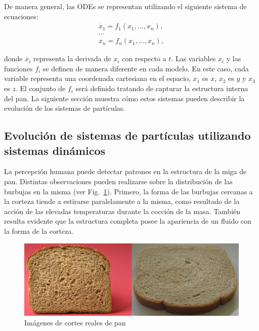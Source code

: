 De manera general, las ODEs se representan utilizando el siguiente sistema de ecuaciones:
\begin{equation} \label{eq:simple}  
  \begin{aligned}
    \dot{x_{1}} = f_{1}(x_{1},\ldots,x_{n}),\\
    \ldots\\
    \dot{x_{n}} = f_{n}(x_{1},\ldots,x_{n}),
  \end{aligned}
\end{equation}

\noindent donde $\dot{x_{i}}$ representa la derivada de $x_{i}$ con respecto
a $t$.
Las variables $x_{i}$ y las funciones $f_{i}$ se definen de manera diferente en cada modelo.
En este caso, cada variable representa una coordenada cartesiana en el espacio, $x_{1}$ es $x$, $x_{2}$ es $y$ y $x_{3}$ es $z$.
El conjunto de $f_{i}$ ser\'a definido tratando de capturar la estructura interna del pan. 
La siguiente secci\'on muestra cómo estos sistemas pueden describir la evoluci\'on de los sistemas de part\'iculas.

\subsection{Evoluci\'on de sistemas de part\'iculas utilizando sistemas din\'amicos}

La percepci\'on humana puede detectar patrones en la estructura de la miga de pan. Distintas observaciones pueden realizarse sobre la distribuci\'on de las burbujas en la misma (ver Fig.~\ref{fg:panreal}).
Primero, la forma de las burbujas cercanas a la corteza tiende a estirarse paralelamente a la misma, como resultado de la acci\'on de las elevadas temperaturas durante la cocci\'on de la masa.
Tambi\'en resulta evidente que la estructura completa posee la apariencia de un fluido con la forma de la corteza.


\begin{figure}[htb!]
  \centerline{\includegraphics[width=13cm]{figures/panreal}}
  \caption{Imágenes de cortes reales de pan}
  \label{fg:panreal}
\end{figure}

